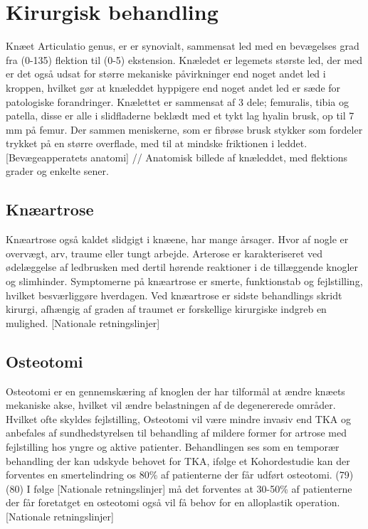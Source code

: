 \section{Kirurgisk behandling}

Knæet Articulatio genus, er er synovialt, sammensat led med en bevægelses grad fra (0-135\deg) flektion til (0-5\deg) ekstension. Knæledet er legemets største led, der med er det også udsat for større mekaniske påvirkninger end noget andet led i kroppen, hvilket gør at knæleddet hyppigere end noget andet led er sæde for patologiske forandringer. Knælettet er sammensat af 3 dele; femuralis, tibia og patella, disse er alle i slidfladerne beklædt med et tykt lag hyalin brusk, op til 7 mm på femur. Der sammen meniskerne, som er fibrøse brusk stykker som fordeler trykket på en større overflade, med til at mindske friktionen i leddet. [Bevægeapperatets anatomi]
//
Anatomisk billede af knæleddet, med flektions grader og enkelte sener. 
\subsection{Knæartrose}

Knæartrose også kaldet slidgigt i knæene, har mange årsager. Hvor af nogle er overvægt, arv, traume eller tungt arbejde. Arterose er karakteriseret ved ødelæggelse af ledbrusken med dertil hørende reaktioner i de tillæggende knogler og slimhinder. Symptomerne på knæartrose er smerte, funktionstab og fejlstilling, hvilket besværliggøre hverdagen. 
Ved knæartrose er sidste behandlings skridt kirurgi, afhængig af graden af traumet er forskellige kirurgiske indgreb en mulighed. [Nationale retningslinjer] 

\subsection{Osteotomi}
Osteotomi er en gennemskæring af knoglen der har tilformål at ændre knæets mekaniske akse, hvilket vil ændre belastningen af de degenererede områder. Hvilket ofte skyldes fejlstilling, Osteotomi vil være mindre invasiv end TKA og anbefales af sundhedstyrelsen til behandling af mildere former for artrose med fejlstilling hos yngre og aktive patienter. Behandlingen ses som en temporær behandling der kan udskyde behovet for TKA, ifølge et Kohordestudie kan der forventes en smertelindring os 80\% af patienterne der får udført osteotomi. (79)(80) I følge [Nationale retningslinjer] må det forventes at 30-50\% af patienterne der får foretatget en osteotomi også vil få behov for en alloplastik operation. [Nationale retningslinjer]  

